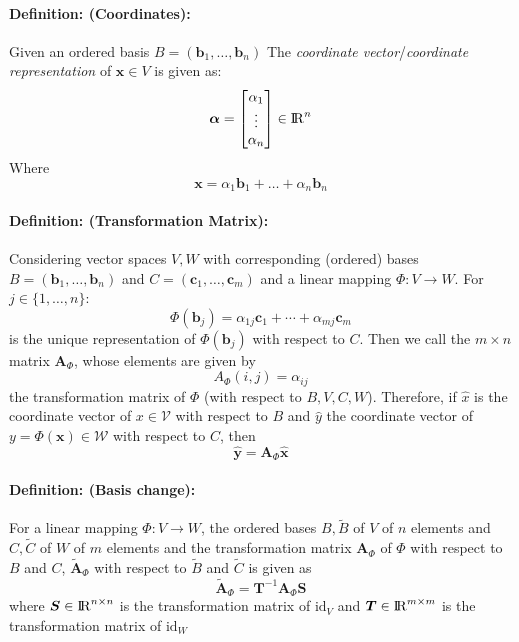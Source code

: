 \documentclass[12pt]{article}
\newcommand{\R}{{\rm I\!R}}
\newcommand{\A}{{\bm{A}}}
\newcommand{\vecs}[2]{{\bm{#1}_1, \dots, \bm{#1}_#2}}
\newcommand{\xdefinition}[2]{\paragraph{\colorbox{#1!30}{\textbf{Definition:}} (#2):}}
\newcommand{\mc}[1]{\mathcal{#1}}
\begin{document}
\xdefinition{blue}{Coordinates} Given an ordered basis $B = (\vecs{b}{n})$ The \textit{coordinate vector}/\textit{coordinate representation} of $\bm{x} \in V$ is given as:
%
\begin{equation}
	\bm{\alpha} = \begin{bmatrix}
		\alpha_1 \\
		\vdots \\
		\alpha_n
	\end{bmatrix} \in \R^n
\end{equation}
%
Where
%
\begin{equation}
	\bm{x} = \alpha_1 \bm{b}_1 + \dots + \alpha_n \bm{b}_n
\end{equation}

\xdefinition{blue}{Transformation Matrix} Considering vector spaces $V, W$ with corresponding (ordered) bases $B = (\vecs{b}{n})$ and $C = (\vecs{c}{m})$ and a linear mapping $\Phi : V \rightarrow W$. For $j \in \{1, \dots, n\}$:
%
\begin{equation}
	\Phi(\bm{b}_j) = \alpha_{1j} \bm{c}_1 + \cdots + \alpha_{mj} \bm{c}_m
\end{equation}
%
is the unique representation of $\Phi(\bm{b}_j)$ with respect to $C$. Then we call the $m \times n$ matrix $\A_\Phi$, whose elements are given by
%
\begin{equation}
	A_\Phi(i, j) = \alpha_{ij}
\end{equation}
%
the transformation matrix of $\Phi$ (with respect to $B, V, C, W$). Therefore, if $\hat{x}$ is the coordinate vector of $x \in \mc{V}$ with respect to $B$ and $\hat{y}$ the coordinate vector of $y = \Phi(\bm{x}) \in \mc{W}$ with respect to $C$, then
%
\begin{equation}
	\hat{\bm{y}} = \A_\Phi \hat{\bm{x}}
\end{equation}

\xdefinition{red}{Basis change} For a linear mapping $\Phi : V \rightarrow W$, the ordered bases $B, \tilde{B}$ of $V$ of $n$ elements and $C, \tilde{C}$ of $W$ of $m$ elements and the transformation matrix $\A_\Phi$ of $\Phi$ with respect to $B$ and $C$, $\tilde{\A}_\Phi$ with respect to $\tilde{B}$ and $\tilde{C}$ is given as
%
\begin{equation}
	\tilde{\A}_\Phi = \bm{T}^{-1} \A_\Phi \bm{S}
\end{equation}
%
where $\bm{S} \in \R^{n \times n}$ is the transformation matrix of $\text{id}_V$ and $\bm{T} \in \R^{m \times m}$ is the transformation matrix of $\text{id}_W$
\end{document}
